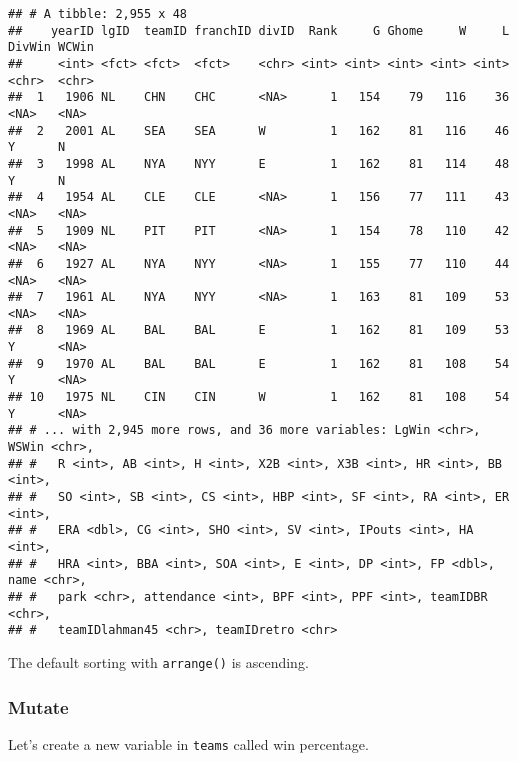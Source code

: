 \documentclass[
]{article}
\newenvironment{Shaded}{\begin{snugshade}}{\end{snugshade}}
\newcommand{\DataTypeTok}[1]{\textcolor[rgb]{0.13,0.29,0.53}{#1}}
\newcommand{\KeywordTok}[1]{\textcolor[rgb]{0.13,0.29,0.53}{\textbf{#1}}}
\newcommand{\NormalTok}[1]{#1}
\newcommand{\OperatorTok}[1]{\textcolor[rgb]{0.81,0.36,0.00}{\textbf{#1}}}
\newcommand{\StringTok}[1]{\textcolor[rgb]{0.31,0.60,0.02}{#1}}
\begin{document}
\begin{verbatim}
## # A tibble: 2,955 x 48
##    yearID lgID  teamID franchID divID  Rank     G Ghome     W     L DivWin WCWin
##     <int> <fct> <fct>  <fct>    <chr> <int> <int> <int> <int> <int> <chr>  <chr>
##  1   1906 NL    CHN    CHC      <NA>      1   154    79   116    36 <NA>   <NA> 
##  2   2001 AL    SEA    SEA      W         1   162    81   116    46 Y      N    
##  3   1998 AL    NYA    NYY      E         1   162    81   114    48 Y      N    
##  4   1954 AL    CLE    CLE      <NA>      1   156    77   111    43 <NA>   <NA> 
##  5   1909 NL    PIT    PIT      <NA>      1   154    78   110    42 <NA>   <NA> 
##  6   1927 AL    NYA    NYY      <NA>      1   155    77   110    44 <NA>   <NA> 
##  7   1961 AL    NYA    NYY      <NA>      1   163    81   109    53 <NA>   <NA> 
##  8   1969 AL    BAL    BAL      E         1   162    81   109    53 Y      <NA> 
##  9   1970 AL    BAL    BAL      E         1   162    81   108    54 Y      <NA> 
## 10   1975 NL    CIN    CIN      W         1   162    81   108    54 Y      <NA> 
## # ... with 2,945 more rows, and 36 more variables: LgWin <chr>, WSWin <chr>,
## #   R <int>, AB <int>, H <int>, X2B <int>, X3B <int>, HR <int>, BB <int>,
## #   SO <int>, SB <int>, CS <int>, HBP <int>, SF <int>, RA <int>, ER <int>,
## #   ERA <dbl>, CG <int>, SHO <int>, SV <int>, IPouts <int>, HA <int>,
## #   HRA <int>, BBA <int>, SOA <int>, E <int>, DP <int>, FP <dbl>, name <chr>,
## #   park <chr>, attendance <int>, BPF <int>, PPF <int>, teamIDBR <chr>,
## #   teamIDlahman45 <chr>, teamIDretro <chr>
\end{verbatim}

The default sorting with \texttt{arrange()} is ascending.

\hypertarget{mutate}{%
\subsubsection{Mutate}\label{mutate}}

Let's create a new variable in \texttt{teams} called win percentage.

\begin{Shaded}
\end{Shaded}
\end{document}
